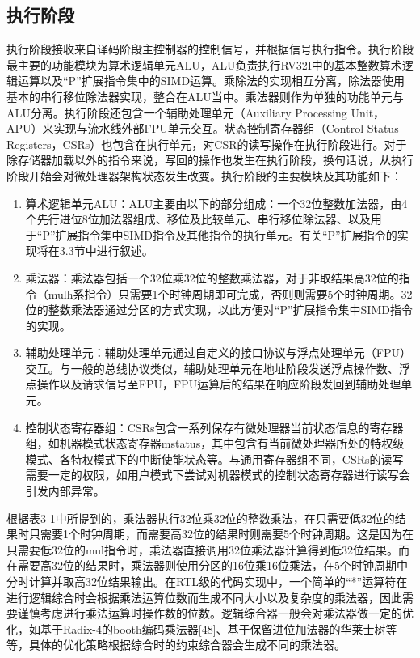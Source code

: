 \subsection{执行阶段}

执行阶段接收来自译码阶段主控制器的控制信号，并根据信号执行指令。执行阶段最主要的功能模块为算术逻辑单元ALU，ALU负责执行RV32I中的基本整数算术逻辑运算以及“P”扩展指令集中的SIMD运算。乘除法的实现相互分离，除法器使用基本的串行移位除法器实现，整合在ALU当中。乘法器则作为单独的功能单元与ALU分离。执行阶段还包含一个辅助处理单元（Auxiliary Processing Unit，APU）来实现与流水线外部FPU单元交互。状态控制寄存器组（Control Status Registers，CSRs）也包含在执行单元，对CSR的读写操作在执行阶段进行。对于除存储器加载以外的指令来说，写回的操作也发生在执行阶段，换句话说，从执行阶段开始会对微处理器架构状态发生改变。执行阶段的主要模块及其功能如下：

\begin{enumerate}
	\item 算术逻辑单元ALU：ALU主要由以下的部分组成：一个32位整数加法器，由4个先行进位8位加法器组成、移位及比较单元、串行移位除法器、以及用于“P”扩展指令集中SIMD指令及其他指令的执行单元。有关“P”扩展指令的实现将在3.3节中进行叙述。
	\item 乘法器：乘法器包括一个32位乘32位的整数乘法器，对于非取结果高32位的指令（mulh系指令）只需要1个时钟周期即可完成，否则则需要5个时钟周期。32位的整数乘法器通过分区的方式实现，以此方便对“P”扩展指令集中SIMD指令的实现。
	\item 辅助处理单元：辅助处理单元通过自定义的接口协议与浮点处理单元（FPU）交互。与一般的总线协议类似，辅助处理单元在地址阶段发送浮点操作数、浮点操作以及请求信号至FPU，FPU运算后的结果在响应阶段发回到辅助处理单元。
	\item 控制状态寄存器组：CSRs包含一系列保存有微处理器当前状态信息的寄存器组，如机器模式状态寄存器mstatus，其中包含有当前微处理器所处的特权级模式、各特权模式下的中断使能状态等。与通用寄存器组不同，CSRs的读写需要一定的权限，如用户模式下尝试对机器模式的控制状态寄存器进行读写会引发内部异常。
\end{enumerate}

根据表3-1中所提到的，乘法器执行32位乘32位的整数乘法，在只需要低32位的结果时只需要1个时钟周期，而需要高32位的结果时则需要5个时钟周期。这是因为在只需要低32位的mul指令时，乘法器直接调用32位乘法器计算得到低32位结果。而在需要高32位的结果时，乘法器则使用分区的16位乘16位乘法，在5个时钟周期中分时计算并取高32位结果输出。在RTL级的代码实现中，一个简单的“*”运算符在进行逻辑综合时会根据乘法运算位数而生成不同大小以及复杂度的乘法器，因此需要谨慎考虑进行乘法运算时操作数的位数。逻辑综合器一般会对乘法器做一定的优化，如基于Radix-4的booth编码乘法器[48]、基于保留进位加法器的华莱士树等等，具体的优化策略根据综合时的约束综合器会生成不同的乘法器。

